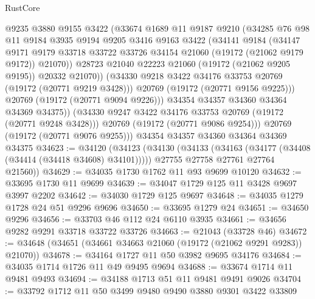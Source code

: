 \begin{lexlean}{RustCore}
\begin{coremodule}
                @9235
                @3880
                @9155
                @3422
                (@33674
                  @1689
                  @11
                  @9187
                  @9210
                  (@34285
                    @76
                    @98
                    @11
                    @9184
                    @3935
                    @9194
                    @9205
                    @3416
                    @9163
                    @3422
                    (@34141
                      @9184
                      (@34147
                        @9171
                        @9179
                        @33718
                        @33722
                        @33726
                        @34154
                        @21060
                        (@19172 (@21062 @9179 @9172))
                        @21070))
                    @28723
                    @21040
                    @22223
                    @21060
                    (@19172 (@21062 @9205 @9195))
                    @20332
                    @21070))
                (@34330 @9218 @3422 @34176 @33753 @20769 (@19172 (@20771 @9219 @3428)))
                @20769
                (@19172 (@20771 @9156 @9225)))
              @20769
              (@19172 (@20771 @9094 @9226)))
            @34354
            @34357
            @34360
            @34364
            @34369
            @34375))
        (@34330 @9247 @3422 @34176 @33753 @20769 (@19172 (@20771 @9248 @3428)))
        @20769
        (@19172 (@20771 @9086 @9254)))
      @20769
      (@19172 (@20771 @9076 @9255)))
    @34354
    @34357
    @34360
    @34364
    @34369
    @34375
@34623 := @34120
    (@34123
      (@34130
        (@34133 (@34163 (@34177 (@34408 (@34414 (@34418 @34608) @34101)))))
        @27755
        @27758
        @27761
        @27764
        @21560))
@34629 := @34035 @1730 @1762 @11 @93 @9699 @10120
@34632 := @33695 @1730 @11 @9699
@34639 := @34047 @1729 @125 @11 @3428 @9697 @3997 @2202
@34642 := @34030 @1729 @125 @9697
@34648 := @34035 @1279 @1728 @24 @51 @9296 @9696
@34650 := @33695 @1279 @24
@34651 := @34650 @9296
@34656 := @33703 @46 @112 @24 @6110 @3935
@34661 := @34656 @9282 @9291 @33718 @33722 @33726
@34663 := @21043 (@33728 @46)
@34672 := @34648 (@34651 (@34661 @34663 @21060 (@19172 (@21062 @9291 @9283)) @21070))
@34678 := @34164 @1727 @11 @50 @3982 @9695 @34176
@34684 := @34035 @1714 @1726 @11 @49 @9495 @9694
@34688 := @33674 @1714 @11 @9481 @9493
@34694 := @34188 @1713 @51 @11 @9481 @9491 @9026
@34704 := @33792 @1712 @11 @50 @3499 @9480 @9490 @3880 @9301 @3422 @33809

\end{coremodule}
\end{lexlean}
